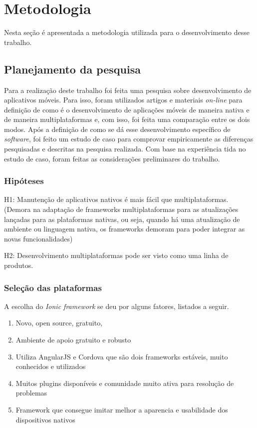 \chapter{Metodologia} \label{metodologia}

Nesta seção é apresentada a metodologia utilizada para o desenvolvimento desse trabalho.

\section{Planejamento da pesquisa} \label{sec:planejamento}

Para a realização deste trabalho foi feita uma pesquisa sobre desenvolvimento de aplicativos móveis. Para isso, foram utilizados artigos e materiais \textit{on-line} para definição de como é o desenvolvimento
de aplicações móveis de maneira nativa e de maneira multiplataformas e, com isso, foi feita uma comparação entre os dois modos. Após a definição de como se dá esse desenvolvimento específico de \textit{software},
foi feito um estudo de caso para comprovar empiricamente as diferenças pesquisadas e descritas na pesquisa realizada. Com base na experiência tida no estudo de caso, foram feitas as considerações preliminares
do trabalho.

\subsection{Hipóteses} \label{subsec:hipoteses}

H1: Manutenção de aplicativos nativos é mais fácil que multiplataformas. 
(Demora na adaptação de frameworks multiplataformas para as atualizações lançadas para as plataformas nativas, ou seja, quando há uma atualização de ambiente ou linguagem nativa,
os frameworks demoram para poder integrar as novas funcionalidades)


H2: Desenvolvimento multiplataformas pode ser visto como uma linha de produtos.


\subsection{Seleção das plataformas} \label{subsec:selecaodasplataformas}

A escolha do \textit{Ionic framework} se deu por alguns fatores, listados a seguir. 
\begin{enumerate}
    \item Novo, open source, gratuito,
    \item Ambiente de apoio gratuito e robusto
    \item Utiliza AngularJS e Cordova que são dois frameworks estáveis, muito conhecidos e utilizados
    \item Muitos plugins disponíveis e comunidade muito ativa para resolução de problemas %
    \item Framework que consegue imitar melhor a aparencia e usabilidade dos dispositivos nativos %
\end{enumerate}
 
